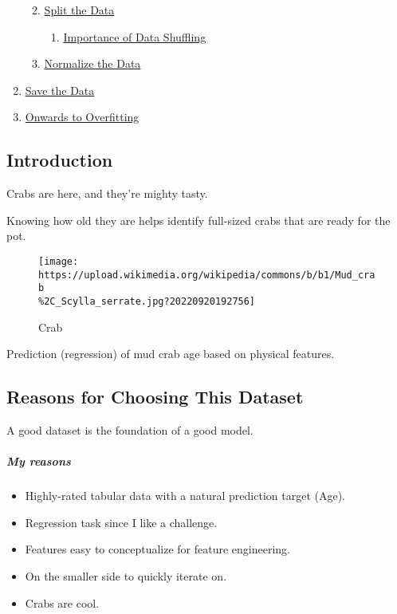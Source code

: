 \documentclass[11pt]{article}
\providecommand{\tightlist}{%
      \setlength{\itemsep}{0pt}\setlength{\parskip}{0pt}}
\begin{document}
\begin{enumerate}
  \begin{enumerate}
  \def\labelenumii{\arabic{enumii}.}
  \tightlist
  \item
    \hyperref[split-the-data]{Split the Data}

    \begin{enumerate}
    \def\labelenumiii{\arabic{enumiii}.}
    \tightlist
    \item
      \hyperref[importance-of-data-shuffling]{Importance of Data Shuffling}
    \end{enumerate}
  \item
    \hyperref[normalize-the-data]{Normalize the Data}
  \end{enumerate}
\item
  \hyperref[save-the-data]{Save the Data}
\item
  \hyperref[onwards-to-overfitting]{Onwards to Overfitting}
\end{enumerate}

    \subsection{Introduction}\label{introduction}

Crabs are here, and they're mighty tasty.

Knowing how old they are helps identify full-sized crabs that are ready
for the pot.

\begin{figure}
\centering
\texttt{[image: https://upload.wikimedia.org/wikipedia/commons/b/b1/Mud\_crab\\\%2C\_Scylla\_serrate.jpg?20220920192756]}
\caption{Crab}
\end{figure}

Prediction (regression) of mud crab age based on physical features.

\subsection{Reasons for Choosing This
Dataset}\label{reasons-for-choosing-this-dataset}

A good dataset is the foundation of a good model.

\subparagraph{My reasons}\label{my-reasons}

\begin{itemize}
\tightlist
\item
  Highly-rated tabular data with a natural prediction target (Age).
\item
  Regression task since I like a challenge.
\item
  Features easy to conceptualize for feature engineering.
\item
  On the smaller side to quickly iterate on.
\item
  Crabs are cool.
\end{itemize}
\end{document}
